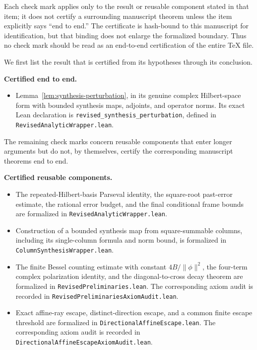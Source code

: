 \documentclass[reqno]{amsart}
\numberwithin{equation}{section}
\theoremstyle{definition}
\theoremstyle{remark}
\newcommand{\LeanSourceLink}[1]{{\small\nolinkurl{#1}}}
\begin{document}
\begin{center}
\end{center}

Each check mark applies only to the result or reusable component stated in
that item; it does not certify a surrounding manuscript theorem unless the
item explicitly says ``end to end.''  The certificate is hash-bound to this
manuscript for identification, but that binding does not enlarge the
formalized boundary.  Thus no check mark should be read as an end-to-end
certification of the entire \TeX{} file.

We first list the result that is certified from its hypotheses through its
conclusion.

\noindent\textbf{Certified end to end.}
\begin{itemize}[label=\(\checkmark\),leftmargin=*]
\item Lemma~\ref{lem:synthesis-perturbation}, in its genuine complex
Hilbert-space form with bounded synthesis maps, adjoints, and operator norms.
Its exact Lean declaration is \texttt{revised\_synthesis\_perturbation},
defined in
\LeanSourceLink{RevisedAnalyticWrapper.lean}.
\end{itemize}

The remaining check marks concern reusable components that enter longer
arguments but do not, by themselves, certify the corresponding manuscript
theorems end to end.

\noindent\textbf{Certified reusable components.}
\begin{itemize}[label=\(\checkmark\),leftmargin=*]
\item The repeated-Hilbert-basis Parseval identity, the square-root past-error
estimate, the rational error budget, and the final conditional frame bounds
are formalized in
\LeanSourceLink{RevisedAnalyticWrapper.lean}.

\item Construction of a bounded synthesis map from square-summable columns,
including its single-column formula and norm bound, is formalized in
\LeanSourceLink{ColumnSynthesisWrapper.lean}.

\item The finite Bessel counting estimate with constant
$4B/\|\phi\|^2$, the four-term complex polarization identity, and the
diagonal-to-cross decay theorem are formalized in
\LeanSourceLink{RevisedPreliminaries.lean}.  The corresponding axiom audit is
recorded in \LeanSourceLink{RevisedPreliminariesAxiomAudit.lean}.

\item Exact affine-ray escape, distinct-direction escape, and a common finite
escape threshold are formalized in
\LeanSourceLink{DirectionalAffineEscape.lean}.  The corresponding axiom audit
is recorded in \LeanSourceLink{DirectionalAffineEscapeAxiomAudit.lean}.
\end{itemize}
\end{document}
